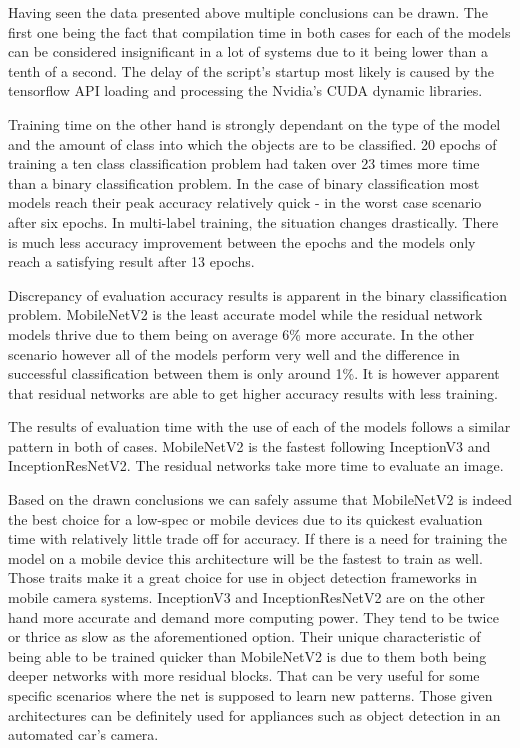 \documentclass{ijisa}
\begin{document}
Having seen the data presented above multiple conclusions can be drawn. The first one being the fact that compilation time in both cases for each of the models can be considered insignificant in a lot of systems due to it being lower than a tenth of a second. The delay of the script's startup most likely is caused by the tensorflow API loading and processing the Nvidia's CUDA dynamic libraries. 

Training time on the other hand is strongly dependant on the type of the model and the amount of class into which the objects are to be classified. 20 epochs of training a ten class classification problem had taken over 23 times more time than a binary classification problem. In the case of binary classification most models reach their peak accuracy relatively quick - in the worst case scenario after six epochs. In  multi-label training, the situation changes drastically. There is much less accuracy improvement between the epochs and the models only reach a satisfying result after 13 epochs. 

Discrepancy of evaluation accuracy results is apparent in the binary classification problem. MobileNetV2 is the least accurate model while the residual network models thrive due to them being on average 6\% more accurate. In the other scenario however all of the models perform very well and the difference in successful classification between them is only around 1\%. It is however apparent that residual networks are able to get higher accuracy results with less training. 

The results of evaluation time with the use of each of the models follows a similar pattern in both of cases. MobileNetV2 is the fastest following InceptionV3 and InceptionResNetV2. The residual networks take more time to evaluate an image.

Based on the drawn conclusions we can safely assume that MobileNetV2 is indeed the best choice for a low-spec or mobile devices due to its quickest evaluation time with relatively little trade off for accuracy. If there is a need for training the model on a mobile device this architecture will be the fastest to train as well. Those traits make it a great choice for use in object detection frameworks in mobile camera systems. InceptionV3 and InceptionResNetV2 are on the other hand more accurate and demand more computing power. They tend to be twice or thrice as slow as the aforementioned option. Their unique characteristic of being able to be trained quicker than MobileNetV2 is due to them both being deeper networks with more residual blocks. That can be very useful for some specific scenarios where the net is supposed to learn new patterns. Those given architectures can be definitely used for appliances such as object detection in an automated car's camera.  



\end{document}

